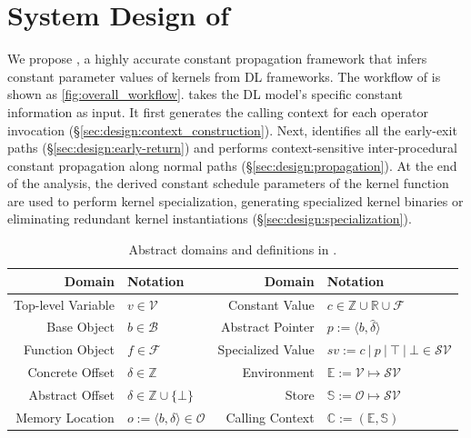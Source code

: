 \section{System Design of \mysys}
\label{sec:design}



We propose \mysys, a highly accurate constant propagation framework that infers constant parameter values of kernels from DL frameworks.
The workflow of \mysys is shown as \autoref{fig:overall_workflow}.
\mysys takes the DL model's specific constant information as input.
It first generates the calling context for each operator invocation (\S\ref{sec:design:context_construction}).
Next, \mysys identifies all the early-exit paths (\S\ref{sec:design:early-return}) and performs context-sensitive inter-procedural constant propagation along normal paths (\S\ref{sec:design:propagation}).
At the end of the analysis, the derived constant schedule parameters of the kernel function are used to perform kernel specialization, generating specialized kernel binaries or eliminating redundant kernel instantiations (\S\ref{sec:design:specialization}).

\begin{table}[htbp]
  \centering
  \small
  \renewcommand{\arraystretch}{1.2}
  \setlength{\tabcolsep}{5pt} 
  \caption{Abstract domains and definitions in \mysys.}
  \label{fig:abstract-domain}
  \begin{tabular}{rl @{\hskip 0.8cm} rl}
    \toprule
    \textbf{Domain} & \textbf{Notation} & \textbf{Domain} & \textbf{Notation} \\
    \midrule
    Top-level Variable & $v \in \mathcal{V}$ & 
    Constant Value & $c \in \mathbb{Z} \cup \mathbb{R} \cup \mathcal{F}$ \\
    
    Base Object & $b \in \mathcal{B}$ & 
    Abstract Pointer & $p := \langle b, \hat{\delta} \rangle$ \\
    
    Function Object & $f \in \mathcal{F}$ & 
    Specialized Value & $sv := c~|~p~|~\top~|~\bot \in \mathcal{SV}$ \\
    
    Concrete Offset & $\delta \in \mathbb{Z}$ & 
    Environment & $\mathbb{E} := \mathcal{V} \mapsto \mathcal{SV}$ \\
    
    Abstract Offset & $\hat{\delta} \in \mathbb{Z} \cup \{ \bot \}$ & 
    Store & $\mathbb{S} := \mathcal{O} \mapsto \mathcal{SV}$ \\
    
    Memory Location & $o := \langle b, \delta \rangle \in \mathcal{O}$ & 
    Calling Context & $\mathbb{C} := (\mathbb{E}, \mathbb{S})$ \\
    \bottomrule
  \end{tabular}
\end{table}

